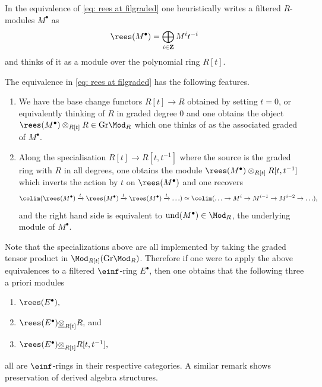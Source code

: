 \documentclass[10pt,reqno]{amsart}
\numberwithin{equation}{section}
\newcommand{\ZZ}{\mathbf{Z}}
\newcommand{\Gr}{\mathrm{Gr}}
\begin{document}
\begin{remark}\label{remark: base change on rees}
    
In the equivalence of \ref{eq: rees at filgraded} one heuristically writes a filtered $R$-modules $M^\bullet$ as $$\rees(M^\bullet)=\bigoplus_{i\in \ZZ}M^it^{-i}$$ and thinks of it as a module over the polynomial ring $R[t].$

The equivalence in \ref{eq: rees at filgraded} has the following features.

\begin{enumerate}
    \item We have the base change functors $R[t]\to R$ obtained by setting $t=0$, or equivalently thinking of $R$ in graded degree $0$ and one obtains the object $\rees(M^\bullet)\otimes_{R[t]}R\in \Gr\Mod_R$ which one thinks of as the associated graded of $M^\bullet.$
    \item Along the specialisation $R[t]\to R[t,t^{-1}]$ where the source is the graded ring with $R$ in all degrees, one obtains the module $\rees(M^\bullet)\otimes_{R[t]}R[t,t^{-1}]$ which inverts the action by $t$ on $\rees(M^\bullet)$ and one recovers $$\colim(\rees(M^\bullet)\xrightarrow{t} \rees(M^\bullet)\xrightarrow{t}\rees(M^\bullet)\xrightarrow{t}\ldots)\simeq \colim(\ldots \to M^i\to M^{i-1}\to M^{i-2}\to \ldots ),$$ and the right hand side is equivalent to $\mathrm{und}(M^\bullet)\in \Mod_R$, the underlying module of $M^\bullet$.
\end{enumerate}
\end{remark}

\begin{remark}\label{remark: all base changes preserve tensors}
    
Note that the specializations above are all implemented by taking the graded tensor product in $\Mod_{R[t]}(\Gr\Mod_R)$. Therefore if one were to apply the above equivalences to a filtered $\einf$-ring $E^\bullet$, then one obtains that the following three a priori modules 
\begin{enumerate}
    \item $\rees(E^\bullet),$
    \item $\rees(E^\bullet)\underline{\otimes}_{R[t]} R,$ and
    \item $\rees(E^\bullet)\underline{\otimes}_{R[t]}R[t,t^{-1}],$
\end{enumerate}

all are $\einf$-rings in their respective categories.
A similar remark shows preservation of derived algebra structures.
\end{remark}
\end{document}
